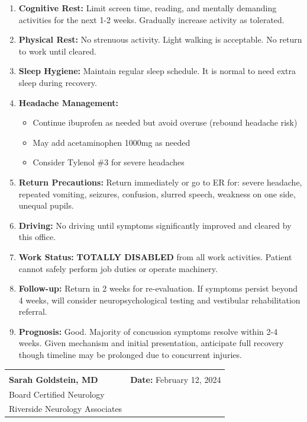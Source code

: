 \documentclass[11pt]{article}
\begin{document}
\begin{enumerate}
\item \textbf{Cognitive Rest:} Limit screen time, reading, and mentally demanding activities for the next 1-2 weeks. Gradually increase activity as tolerated.

\item \textbf{Physical Rest:} No strenuous activity. Light walking is acceptable. No return to work until cleared.

\item \textbf{Sleep Hygiene:} Maintain regular sleep schedule. It is normal to need extra sleep during recovery.

\item \textbf{Headache Management:}
\begin{itemize}[nosep]
\item Continue ibuprofen as needed but avoid overuse (rebound headache risk)
\item May add acetaminophen 1000mg as needed
\item Consider Tylenol \#3 for severe headaches
\end{itemize}

\item \textbf{Return Precautions:} Return immediately or go to ER for: severe headache, repeated vomiting, seizures, confusion, slurred speech, weakness on one side, unequal pupils.

\item \textbf{Driving:} No driving until symptoms significantly improved and cleared by this office.

\item \textbf{Work Status:} \textbf{TOTALLY DISABLED} from all work activities. Patient cannot safely perform job duties or operate machinery.

\item \textbf{Follow-up:} Return in 2 weeks for re-evaluation. If symptoms persist beyond 4 weeks, will consider neuropsychological testing and vestibular rehabilitation referral.

\item \textbf{Prognosis:} Good. Majority of concussion symptoms resolve within 2-4 weeks. Given mechanism and initial presentation, anticipate full recovery though timeline may be prolonged due to concurrent injuries.
\end{enumerate}

\vspace{2em}

\begin{tabular}{@{}p{7cm}p{7cm}@{}}
\hrulefill & \\
\textbf{Sarah Goldstein, MD} & \textbf{Date:} February 12, 2024 \\
Board Certified Neurology & \\
Riverside Neurology Associates & \\
\end{tabular}
\end{document}
